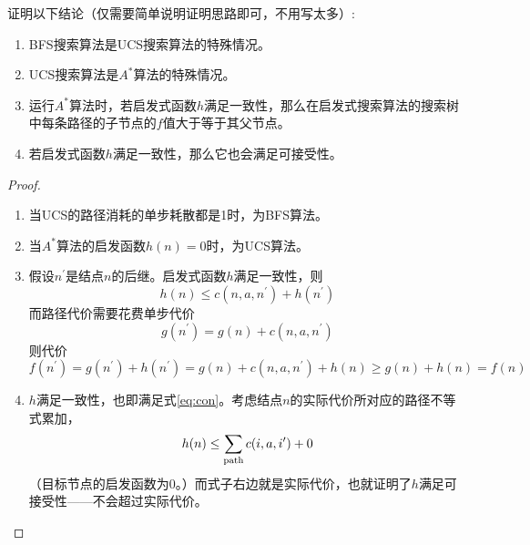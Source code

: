     \begin{problem}
        证明以下结论（仅需要简单说明证明思路即可，不用写太多）:
        \begin{enumerate}
            \item BFS搜索算法是UCS搜索算法的特殊情况。
            \item UCS搜索算法是$A^{\ast}$算法的特殊情况。
            \item 运行$A^{\ast}$算法时，若启发式函数$h$满足一致性，那么在启发式搜索算法的搜索树中每条路径的子节点的$f$值大于等于其父节点。
            \item 若启发式函数$h$满足一致性，那么它也会满足可接受性。
        \end{enumerate}
    \end{problem}

    \begin{proof}
        \begin{enumerate}
            \item 当UCS的路径消耗的单步耗散都是1时，为BFS算法。
            \item 当$A^\ast$算法的启发函数$h(n)=0$时，为UCS算法。
            \item 假设$n^\prime$是结点$n$的后继。启发式函数$h$满足一致性，则
            \begin{equation}\label{eq:con}
                h(n)\leq c(n,a,n^\prime)+h(n^\prime)
            \end{equation}
            而路径代价需要花费单步代价
            \begin{equation*}
                g(n^\prime)=g(n)+c(n,a,n^\prime)
            \end{equation*}
            则代价
            \begin{equation*}
                f(n^\prime) = g(n^\prime) + h(n^\prime) = g(n)+c(n,a,n^\prime)+h(n)\geq g(n)+h(n) = f(n)
            \end{equation*}
            \item 
            $h$满足一致性，也即满足式\eqref{eq:con}。考虑结点$n$的实际代价所对应的路径不等式累加，
            \begin{equation*}
                h(n)\leq\sum_{\rm path} c(i,a,i^\prime) + 0
            \end{equation*}
            （目标节点的启发函数为0。）而式子右边就是实际代价，也就证明了$h$满足可接受性——不会超过实际代价。
        \end{enumerate}
    \end{proof}
